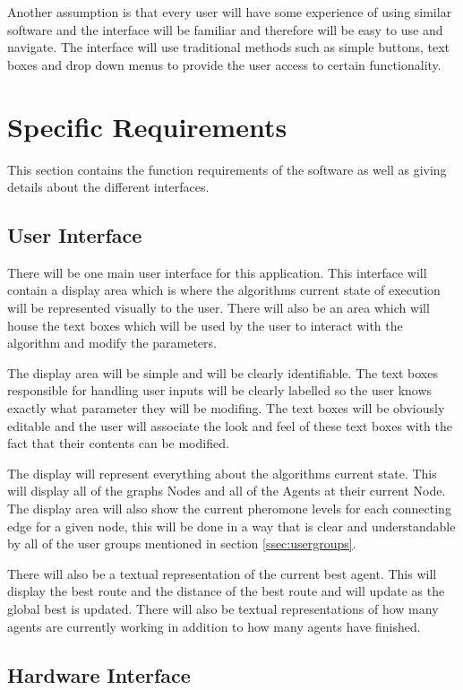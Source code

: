 Another assumption is that every user will have some experience of using similar software and the interface will be familiar and therefore will be easy to use and navigate. The interface will use traditional methods such as simple buttons, text boxes and drop down menus to provide the user access to certain functionality.

\section{Specific Requirements}

This section contains the function requirements of the software as well as giving details about the different interfaces.

\subsection{User Interface}

There will be one main user interface for this application. This interface will contain a display area which is where the algorithms current state of execution will be represented visually to the user. There will also be an area which will house the text boxes which will be used by the user to interact with the algorithm and modify the parameters.

The display area will be simple and will be clearly identifiable. The text boxes responsible for handling user inputs will be clearly labelled so the user knows exactly what parameter they will be modifing. The text boxes will be obviously editable and the user will associate the look and feel of these text boxes with the fact that their contents can be modified.

The display will represent everything about the algorithms current state. This will display all of the graphs Nodes and all of the Agents at their current Node. The display area will also show the current pheromone levels for each connecting edge for a given node, this will be done in a way that is clear and understandable by all of the user groups mentioned in section \ref{ssec:usergroups}.

There will also be a textual representation of the current best agent. This will display the best route and the distance of the best route and will update as the global best is updated. There will also be textual representations of how many agents are currently working in addition to how many agents have finished.

\subsection{Hardware Interface}

